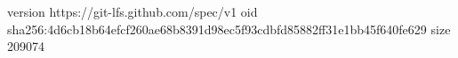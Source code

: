 version https://git-lfs.github.com/spec/v1
oid sha256:4d6cb18b64efcf260ae68b8391d98ec5f93cdbfd85882ff31e1bb45f640fe629
size 209074
